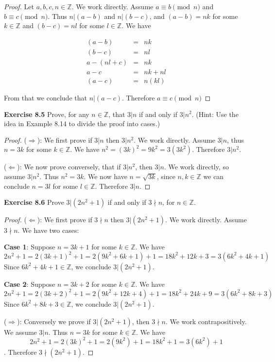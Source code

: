 \documentclass[12pt,oneside]{article}
\newenvironment{exercise}[1]{\vspace{.1in}\noindent\textbf{Exercise #1 \hspace{.05em}}}{}
\newcommand{\Z}{\mathbb{Z}}
\renewcommand{\mod}[3]{#1 \equiv #2 \pmod{#3}}
\begin{document}
\begin{proof}
Let $a,b,c,n \in \Z$. We work directly. Assume $\mod{a}{b}{n}$ and $\mod{b}{c}{n}$. Thus $n|(a-b)$ and $n|(b -c)$, and $(a-b)=nk$ for some $k \in \Z$ and $(b-c)=nl$ for some $l \in \Z$. We have

\begin{eqnarray*}
(a-b) &=& nk \\
(b-c) &=& nl \\
a - (nl + c) &=& nk \\
a - c &=& nk + nl \\
(a-c) &=& n(kl)
\end{eqnarray*}

From that we conclude that $n|(a - c)$. Therefore $\mod{a}{c}{n}$

\end{proof}



\begin{exercise}{8.5}
Prove, for any $n \in \Z$, that $3|n$ if and only if $3|n^2$. (Hint: Use the idea in Example 8.14 to divide the proof into cases.)
\end{exercise}

\begin{proof}
($\Rightarrow$): We first prove if $3|n$ then $3|n^2$. We work directly. Assume $3|n$, thus $n = 3k$ for some $k \in \Z$. We have $n^2 = (3k)^2 = 9k^2 = 3(3k^2)$. Therefore $3|n^2$.

($\Leftarrow$): We now prove conversely, that if $3|n^2$, then $3|n$. We work directly, so assume $3|n^2$. Thus $n^2 = 3k$. We now have $n=\sqrt{3k}$, since $n,k \in \Z$ we can conclude $n = 3l$ for some $l \in \Z$. Therefore $3|n$.
\end{proof}



\begin{exercise}{8.6}
Prove $3|(2n^2 + 1)$ if and only if $3 \nmid n$, for $n \in \Z$.
\end{exercise}

\begin{proof}
($\Leftarrow$): We first prove if $3 \nmid n$ then $3|(2n^2 + 1)$. We work directly. Assume $3 \nmid n$. We have two cases:

\textbf{Case 1}: Suppose $n = 3k + 1$ for some $k \in \Z$. We have
\[2n^2 + 1 = 2(3k + 1)^2 + 1 = 2(9k^2 + 6k + 1) + 1 = 18k^2 + 12k + 3 = 3(6k^2 + 4k + 1)\]
Since $6k^2 + 4k + 1 \in \Z$, we conclude $3|(2n^2 + 1)$.

\textbf{Case 2}: Suppose $n = 3k + 2$ for some $k \in \Z$. We have
\[2n^2 + 1 = 2(3k + 2)^2 + 1 = 2(9k^2 + 12k + 4) + 1 = 18k^2 + 24k + 9 = 3(6k^2 + 8k + 3)\]
Since $6k^2 + 8k + 3 \in \Z$, we conclude $3|(2n^2 + 1)$.

($\Rightarrow$): Conversely we prove if $3|(2n^2 + 1)$, then $3 \nmid n$. We work contrapositively. We assume $3|n$. Thus $n = 3k$ for some $k \in \Z$. We have
\[2n^2+ 1 = 2(3k)^2 + 1 = 2(9k^2) + 1 = 18k^2 + 1 = 3(6k^2) + 1\].
Therefore $3 \nmid (2n^2 + 1)$.
\end{proof}
\end{document}
